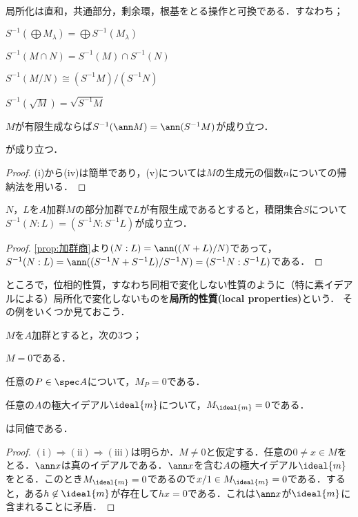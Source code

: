 \begin{prop}\label{prop:局所化はいろんな操作と可換}
	局所化は直和，共通部分，剰余環，根基をとる操作と可換である．すなわち；
	\begin{sakura}
		\item $S^{-1}(\bigoplus M_\lambda)=\bigoplus S^{-1}(M_\lambda)$
		\item $S^{-1}(M\cap N)=S^{-1}(M)\cap S^{-1}(N)$
		\item $S^{-1}(M/N)\cong (S^{-1}M)/(S^{-1}N)$
		\item $S^{-1}(\sqrt{M})=\sqrt{S^{-1}M}$
		\item $M$が有限生成ならば$S^{-1}(\ann M)=\ann(S^{-1}M)$が成り立つ．
	\end{sakura}
	が成り立つ．
\end{prop}
\begin{proof}
	(i)から(iv)は簡単であり，(v)については$M$の生成元の個数$n$についての帰納法を用いる．
\end{proof}

\begin{cor}\label{prop:イデアル商は局所化と可換}
	$N，L$を$A$加群$M$の部分加群で$L$が有限生成であるとすると，積閉集合$S$について $S^{-1}(N:L)=(S^{-1}N:S^{-1}L)$が成り立つ．
\end{cor}
\begin{proof}	
	\ref{prop:加群商}より$(N:L)=\ann((N+L)/N)$であって，$S^{-1}(N:L)=\ann ((S^{-1}N+S^{-1}L)/S^{-1}N)=(S^{-1}N:S^{-1}L)$である．	
\end{proof}

ところで，位相的性質，すなわち同相で変化しない性質のように（特に素イデアルによる）局所化で変化しないものを\textbf{局所的性質(local properties)}という． その例をいくつか見ておこう．

\begin{prop}\label{prop:局所化したら0は局所的}
	$M$を$A$加群とすると，次の3つ；
	\begin{sakura}
		\item $M=0$である．
		\item 任意の$P\in \spec A$について，$M_P=0$である．
		\item 任意の$A$の極大イデアル${\ideal{m}}$について，$M_{{\ideal{m}}}=0$である．
	\end{sakura}
	は同値である．
\end{prop}

\begin{proof}
	$(\text{i})\Longrightarrow(\text{ii})\Longrightarrow(\text{iii})$は明らか．$M\neq0$と仮定する．任意の$0\neq x\in M$をとる．$\ann x$は真のイデアルである．$\ann x$を含む$A$の極大イデアル${\ideal{m}}$をとる．このとき$M_{{\ideal{m}}}=0$であるので$x/1\in M_{{\ideal{m}}}=0$である．すると，ある$h\not\in{\ideal{m}}$が存在して$hx=0$である．これは$\ann x$が${\ideal{m}}$に含まれることに矛盾．
\end{proof}


